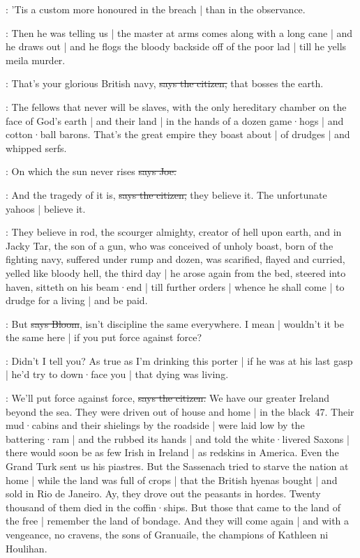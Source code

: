 \johnwyse:
'Tis a custom more honoured in the breach |
than in the observance.

\Nq:
Then he was telling us |
the master at arms
comes along with a long cane |
and he draws out |
and he flogs the bloody backside off of the poor lad |
till he yells meila murder.

\citizen:
That's your glorious British navy,
\sout{says the citizen,}
that bosses the earth.

\citizen:
The fellows that never will be slaves,
with the only hereditary chamber on the face of God's earth |
and their land |
in the hands of a dozen game·hogs |
and cotton·ball barons.
That's the great empire they boast about |
of drudges |
and whipped serfs.%

\joe:
On which the sun never rises
\sout{says Joe.}

\citizen:
And the tragedy of it is,
\sout{says the citizen,}
they believe it.
The unfortunate yahoos |
believe it.

:
They believe in rod,
the scourger almighty,
creator of hell upon earth,
and in Jacky Tar,
the son of a gun,
who was conceived of unholy boast,
born of the fighting navy,
suffered under rump and dozen,
was scarified,
flayed and curried,
yelled like bloody hell,
the third day |
he arose again from the bed,
steered into haven,
sitteth on his beam·end |
till further orders |
whence he shall come |
to drudge for a living |
and be paid.

\Bloom:
But
\sout{says Bloom},
isn't discipline the same everywhere.
I mean |
wouldn't it be the same here |
if you put force against force?

\Nq:
Didn't I tell you?
As true as I'm drinking this porter |
if he was at his last gasp |
he'd try to down·face you |
that dying was living.

\citizen:
We'll put force against force,
\sout{says the citizen.}
We have our greater Ireland beyond the sea.
They were driven out of house and home |
in the black~47.
Their mud·cabins and their shielings by the roadside |
were laid low by the battering·ram |
and the  rubbed its hands |
and told the white·livered Saxons |
there would soon be as few Irish in Ireland |
as redskins in America.
Even the Grand Turk sent us his piastres.
But the Sassenach tried to starve the nation at home
 |
while the land was full of crops |
that the British hyenas bought |
and sold in Rio de Janeiro.
Ay,
they drove out the peasants in hordes.
Twenty thousand of them died in the coffin·ships.
But those that came to the land of the free |
remember the land of bondage.
And they will come again |
and with a vengeance,
no cravens,
the sons of Granuaile,
the champions of Kathleen ni Houlihan.

